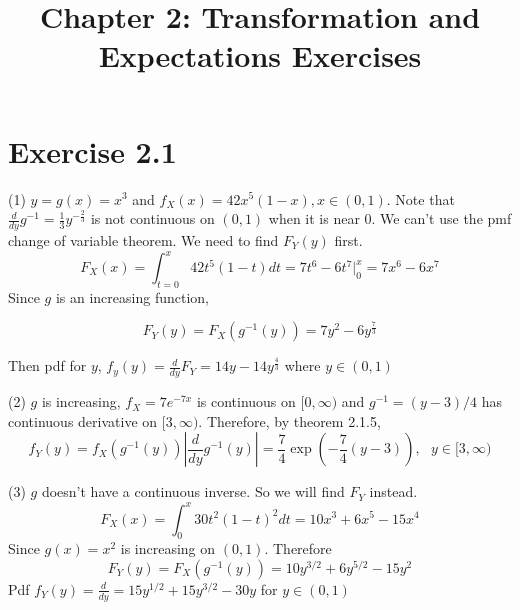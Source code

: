 \documentclass[12pt]{article}
\title{Chapter 2: Transformation and Expectations Exercises}
\begin{document}
\maketitle

\section*{Exercise 2.1}
(1) $y=g(x)=x^3$ and $f_X(x) = 42x^5(1-x), x\in(0,1)$. Note that$\frac{d}{dy}g^{-1} = \frac{1}{3} y^{-\frac{2}{3}}$ is not continuous on $(0,1)$ when it is near 0. We can't use the pmf change of variable theorem. We need to find $F_Y(y)$ first.  
$$ F_X(x) = \int^{x}_{t=0} 42t^5(1-t) dt = 7t^6 - 6t^7 |^{x}_{0} = 7x^6-6x^7$$
Since $g$ is an increasing function, 

$$ F_Y(y) = F_X(g^{-1}(y)) = 7y^2 - 6 y^{\frac{7}{3}}$$

Then pdf for $y$,  $f_y(y) = \frac{d}{dy}F_Y = 14y - 14y^{\frac{4}{3}}$ where $y \in(0,1)$


(2) $g$ is increasing, $f_X = 7e^{-7x}$ is continuous on $[0, \infty)$ and $g^{-1} = (y-3)/4$ has continuous derivative on $[3, \infty)$. Therefore, by theorem 2.1.5, 
$$ f_Y(y) = f_X(g^{-1}(y))\left|\frac{d}{dy}g^{-1}(y)\right| = \frac{7}{4}\exp(-\frac{7}{4}(y-3)), \ \ \ y\in[3,\infty) $$

(3) $g$ doesn't have a continuous inverse. So we will find $F_Y$ instead.
$$ F_X(x) = \int^x_0 30t^2(1-t)^2dt  = 10x^3+6x^5-15x^4$$
Since $g(x) = x^2$ is increasing on $(0,1)$. Therefore
$$ F_Y(y) = F_X(g^{-1}(y)) = 10 y^{3/2} + 6y^{5/2} - 15y^2$$
Pdf $f_Y(y) = \frac{d}{dy} = 15y^{1/2} + 15y^{3/2} - 30y$ for $y\in (0,1)$
\end{document}
